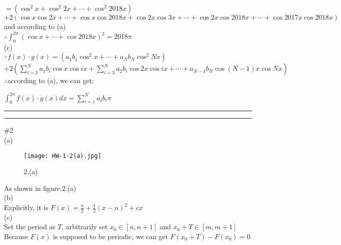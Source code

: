 \documentclass{article}
\begin{document}
\qquad$=(\cos^2{x}+\cos^2{2x}+\cdots+\cos^2{2018x})$\\

\quad\qquad$+2(\cos{x}\cos{2x}+\cdots+\cos{x}\cos{2018x}+\cos{2x}\cos{3x}+\cdots+\cos{2x}\cos{2018x}+\cdots+\cos{2017x}\cos{2018x})$\\

and according to (a)\\

$\therefore$\qquad$\int_{0}^{2\pi}(\cos{x}+\cdots+\cos{2018x})^2=2018\pi$\\

(c)\\

$\because$\qquad$f(x)\displaystyle\cdot g(x)=(a_1b_1\cos^2{x}+\cdots+a_Nb_N\cos^2{Nx})$\\

\qquad\qquad\qquad\qquad\quad$\displaystyle+2(\sum \limits_{i=2}^{N}a_1b_i\cos{x}\cos{ix}+\sum \limits_{i=3}^{N}a_2b_i\cos{2x}\cos{ix}+\cdots+a_{N-1}b_N\cos{(N-1)x}\cos{Nx})$\\

$\therefore$\qquad according to (a), we can get:

\qquad$\displaystyle\int_{0}^{2\pi}f(x)\cdot g(x)dx=\sum \limits_{i=1}^{N}a_ib_i\pi$\\

\hrule
\vskip 1mm
\hrule
\vskip 0.5cm

\textcolor[rgb]{0.00,0.00,0.50}{\#2}\\

(a)\\

\begin{figure}[H]
  \centering
  \texttt{[image: HW-1-2(a).jpg]}\\
  \caption*{2.(a)}
\end{figure}

As shown in figure.2.(a)\\

(b)\\

Explicitly, it is $\displaystyle F(x)=\frac{n}{2}+\frac{1}{2}(x-n)^2+cx$\\

(c)\\

Set the period as $T$, arbitrarily set $x_0\in[n,n+1]$ and $x_0+T\in[m,m+1]$\\

Because $F(x)$ is supposed to be periodic, we can get $F(x_0+T)-F(x_0)=0$\\
\end{document}
